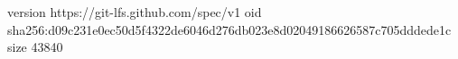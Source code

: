 version https://git-lfs.github.com/spec/v1
oid sha256:d09c231e0ec50d5f4322de6046d276db023e8d02049186626587c705dddede1c
size 43840
